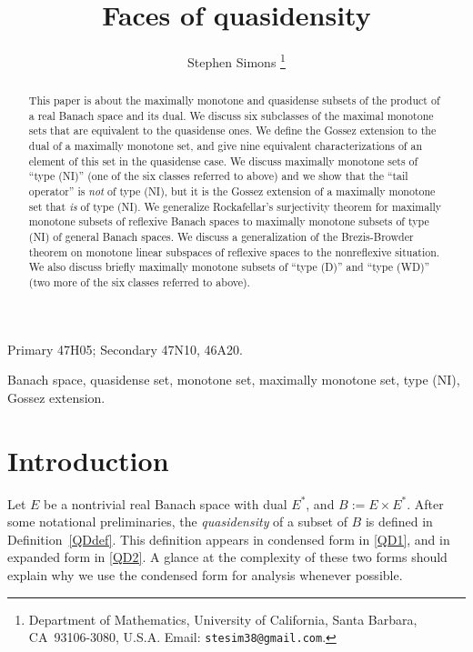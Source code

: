 \documentclass[letterpaper]{article}
\title{Faces of quasidensity}
\author{
Stephen Simons
\thanks{
Department of Mathematics, University of California, Santa Barbara, CA\ 93106-3080, U.S.A.
Email: \texttt{stesim38@gmail.com}.}}
\date{}
\theoremstyle{plain}
\theoremstyle{definition}
\numberwithin{equation}{section}
\newcommand{\Def}{Definition~\ref}
\begin{document}
\maketitle

\begin{abstract}\noindent
This paper is about the maximally monotone and quasidense subsets of the product of a real Banach space and its dual.  We discuss six subclasses of the maximal monotone sets that are equivalent to the quasidense ones.   We define the Gossez extension  to the dual of a maximally monotone set, and give nine equivalent characterizations of an element of this set in the quasidense case.   We discuss maximally monotone sets of ``type (NI)'' (one of the six classes referred to above) and we show that the ``tail operator'' is {\em not} of type (NI), but it is the Gossez extension of a maximally monotone set that {\em is} of type (NI). We  generalize Rockafellar's surjectivity theorem for maximally monotone subsets of reflexive Banach spaces to maximally monotone subsets of type (NI) of general Banach spaces.     We discuss a generalization of the Brezis-Browder theorem on monotone linear subspaces of reflexive spaces to the nonreflexive situation.    
 We also discuss briefly maximally monotone subsets of ``type (D)'' and ``type (WD)'' (two more of the six classes referred to above).
\end{abstract}

{\small {}
{Primary 47H05; Secondary 47N10, 46A20.}}

 Banach space, quasidense set, monotone set, maximally monotone set, type (NI), Gossez extension.


\section{Introduction}
\setlength{\belowdisplayskip}{4pt}
\setlength{\belowdisplayshortskip}{4pt}
\setlength{\abovedisplayskip}{4pt}
\setlength{\abovedisplayshortskip}{4pt}

Let $E$ be a nontrivial real Banach space with dual $E^*$, and $B := E \times E^*$.   After some notational preliminaries, the {\em quasidensity} of a subset of $B$ is defined in \Def{QDdef}.   This definition appears in condensed form in \eqref{QD1}, and in expanded form in \eqref{QD2}.   A glance at the complexity of these two forms should explain why we use the condensed form for analysis whenever possible.
\end{document}
